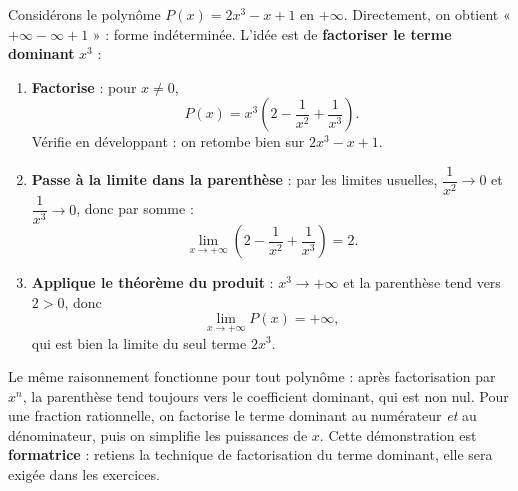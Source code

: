 \documentclass[11pt]{article}
\begin{document}
\begin{experience}
Considérons le polynôme $P(x) = 2x^3 - x + 1$ en $+\infty$. Directement, on obtient « $+\infty - \infty + 1$ » : forme indéterminée. L'idée est de \textbf{factoriser le terme dominant} $x^3$ :
\begin{enumerate}
\item \textbf{Factorise} : pour $x \neq 0$,
\[ P(x) = x^3\left(2 - \dfrac{1}{x^2} + \dfrac{1}{x^3}\right). \]
Vérifie en développant : on retombe bien sur $2x^3 - x + 1$.
\item \textbf{Passe à la limite dans la parenthèse} : par les limites usuelles, $\dfrac{1}{x^2} \to 0$ et $\dfrac{1}{x^3} \to 0$, donc par somme :
\[ \lim_{x \to +\infty} \left(2 - \dfrac{1}{x^2} + \dfrac{1}{x^3}\right) = 2. \]
\item \textbf{Applique le théorème du produit} : $x^3 \to +\infty$ et la parenthèse tend vers $2 > 0$, donc
\[ \lim_{x \to +\infty} P(x) = +\infty, \]
qui est bien la limite du seul terme $2x^3$.
\end{enumerate}
Le même raisonnement fonctionne pour tout polynôme : après factorisation par $x^n$, la parenthèse tend toujours vers le coefficient dominant, qui est non nul. Pour une fraction rationnelle, on factorise le terme dominant au numérateur \emph{et} au dénominateur, puis on simplifie les puissances de $x$. Cette démonstration est \textbf{formatrice} : retiens la technique de factorisation du terme dominant, elle sera exigée dans les exercices.
\end{experience}
\end{document}
